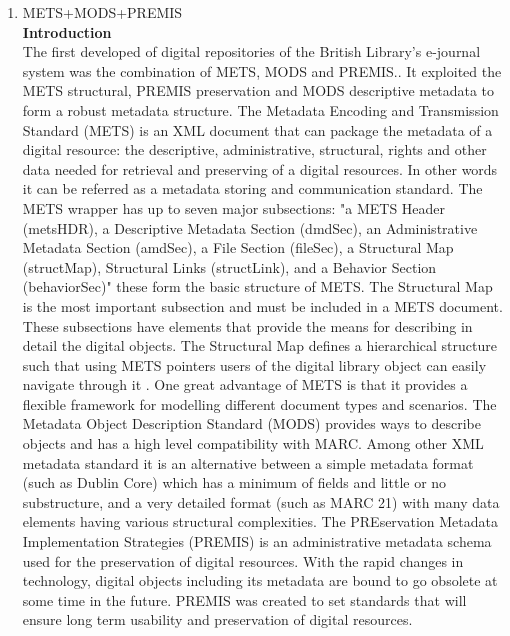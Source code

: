 \begin{enumerate}
	\item METS+MODS+PREMIS\\
	{\bf Introduction}\\
	The first developed of digital repositories of the British Library's e-journal system was the combination of METS, MODS and PREMIS..\cite{Dappert2008} It exploited the METS structural, PREMIS preservation and MODS descriptive metadata to form a robust metadata structure. The Metadata Encoding and Transmission Standard (METS) is an XML document that can package the metadata of a digital resource: the descriptive, administrative, structural, rights and other data needed for retrieval and preserving of a digital resources.\cite{Guenther2003} In other words it can be referred as a metadata storing and communication standard. The METS wrapper has up to seven major subsections: "a METS Header (metsHDR), a Descriptive Metadata Section (dmdSec), an Administrative Metadata Section (amdSec), a File Section (fileSec), a Structural Map (structMap), Structural Links (structLink), and a Behavior Section (behaviorSec)" these form the basic structure of METS. The Structural Map is the most important subsection and must be included in a METS document.\cite{Cheslow2014} These subsections have elements that provide the means for describing in detail the digital objects. The Structural Map defines a hierarchical structure such that using METS pointers users of the digital library object can easily navigate through it . One great advantage of METS is that it provides a flexible framework for modelling different document types and scenarios.\cite{Dappert2008}
	The Metadata Object Description Standard (MODS) provides ways to describe objects and has a high level compatibility with MARC. Among other XML metadata standard it is an alternative between a simple metadata format (such as Dublin Core) which has a minimum of fields and little or no substructure, and a very detailed format (such as MARC 21) with many data elements having various structural complexities.\cite{Guenther2003}
	The PREservation Metadata Implementation Strategies (PREMIS) is an administrative metadata schema used for the preservation of digital resources.\cite{Cheslow2014} With the rapid changes in technology, digital objects including its metadata are bound to go obsolete at some time in the future. PREMIS was created to set standards that will ensure long term usability and preservation of digital resources.
	

\end{enumerate}
